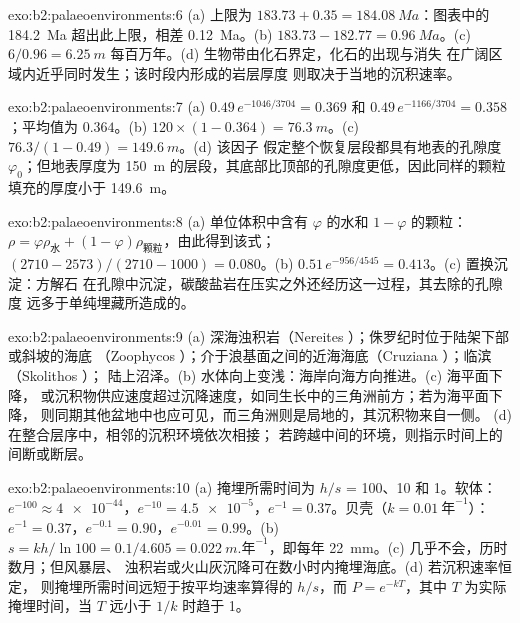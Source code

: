 \begin{solution}{exo:b2:palaeoenvironments:6}
(a) 上限为 $183.73 + 0.35 = \qty{184.08}{Ma}$：图表中的 \qty{184.2}{Ma}
超出此上限，相差 \qty{0.12}{Ma}。(b) $183.73 - 182.77 = \qty{0.96}{Ma}$。(c) $6/0.96 =
\qty{6.25}{m}$ 每百万年。(d) 生物带由化石界定，化石的出现与消失
在广阔区域内近乎同时发生；该时段内形成的岩层厚度
则取决于当地的沉积速率。
\end{solution}

\begin{solution}{exo:b2:palaeoenvironments:7}
(a) $0.49\,e^{-1046/3704} = 0.369$ 和 $0.49\,e^{-1166/3704} = 0.358$；平均值为 $0.364$。(b) $120
\times (1 - 0.364) = \qty{76.3}{m}$。(c) $76.3/(1 - 0.49) = \qty{149.6}{m}$。(d) 该因子
假定整个恢复层段都具有地表的孔隙度 $\varphi_0$；但地表厚度为
\qty{150}{m} 的层段，其底部比顶部的孔隙度更低，因此同样的颗粒
填充的厚度小于 \qty{149.6}{m}。
\end{solution}

\begin{solution}{exo:b2:palaeoenvironments:8}
(a) 单位体积中含有 $\varphi$ 的水和 $1 - \varphi$ 的颗粒：$\rho = \varphi
\rho_{\text{水}} + (1 - \varphi)\rho_{\text{颗粒}}$，由此得到该式；$(2710 -
2573)/(2710 - 1000) = 0.080$。(b) $0.51\,e^{-956/4545} = 0.413$。(c) 置换沉淀：方解石
在孔隙中沉淀，碳酸盐岩在压实之外还经历这一过程，其去除的孔隙度
远多于单纯埋藏所造成的。
\end{solution}

\begin{solution}{exo:b2:palaeoenvironments:9}
(a) 深海浊积岩（Nereites ）；侏罗纪时位于陆架下部或斜坡的海底
（Zoophycos ）；介于浪基面之间的近海海底（Cruziana ）；临滨（Skolithos ）；
陆上沼泽。(b) 水体向上变浅：海岸向海方向推进。(c) 海平面下降，
或沉积物供应速度超过沉降速度，如同生长中的三角洲前方；若为海平面下降，
则同期其他盆地中也应可见，而三角洲则是局地的，其沉积物来自一侧。
(d) 在整合层序中，相邻的沉积环境依次相接；
若跨越中间的环境，则指示时间上的间断或断层。
\end{solution}

\begin{solution}{exo:b2:palaeoenvironments:10}
(a) 掩埋所需时间为 $h/s$ = 100、10 和 \qty{1}{}。软体：$e^{-100} \approx
\num{4e-44}$，$e^{-10} = \num{4.5e-5}$，$e^{-1} = 0.37$。贝壳（$k = \qty{0.01}{\text{年}^{-1}}$）：
$e^{-1} = 0.37$，$e^{-0.1} = 0.90$，$e^{-0.01} = 0.99$。(b) $s = kh/\ln 100 = 0.1/4.605 =
\qty{0.022}{m.\text{年}^{-1}}$，即每年 \qty{22}{mm}。(c) 几乎不会，历时数月；但风暴层、
浊积岩或火山灰沉降可在数小时内掩埋海底。(d) 若沉积速率恒定，
则掩埋所需时间远短于按平均速率算得的 $h/s$，而 $P = e^{-kT}$，其中 $T$
为实际掩埋时间，当 $T$ 远小于 $1/k$ 时趋于 1。
\end{solution}

